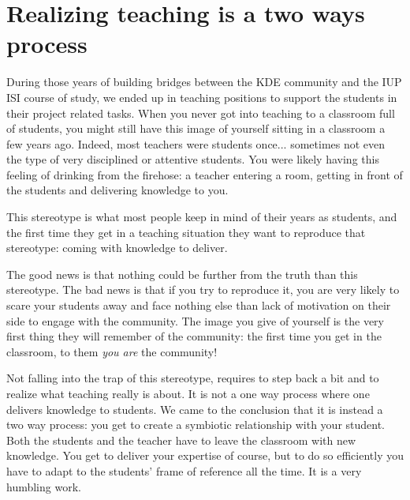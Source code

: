 \section*{Realizing teaching is a two ways process}
During those years of building bridges between the KDE community and the IUP ISI course of study, we ended up in teaching positions to support the students in their project related tasks. When you never got into teaching to a classroom full of students, you might still have this image of yourself sitting in a classroom a few years ago. Indeed, most teachers were students once... sometimes not even the type of very disciplined or attentive students. You were likely having this feeling of drinking from the firehose: a teacher entering a room, getting in front of the students and delivering knowledge to you.

This stereotype is what most people keep in mind of their years as students, and the first time they get in a teaching situation they want to reproduce that stereotype: coming with knowledge to deliver.

The good news is that nothing could be further from the truth than this stereotype. The bad news is that if you try to reproduce it, you are very likely to scare your students away and face nothing else than lack of motivation on their side to engage with the community. The image you give of yourself is the very first thing they will remember of the community: the first time you get in the classroom, to them \emph{you are} the community!

Not falling into the trap of this stereotype, requires to step back a bit and to realize what teaching really is about. It is not a one way process where one delivers knowledge to students. We came to the conclusion that it is instead a two way process: you get to create a symbiotic relationship with your student. Both the students and the teacher have to leave the classroom with new knowledge. You get to deliver your expertise of course, but to do so efficiently you have to adapt to the students' frame of reference all the time. It is a very humbling work.

